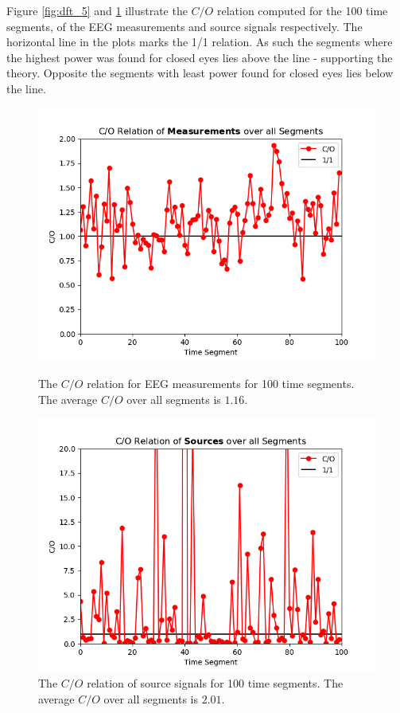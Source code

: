 Figure \ref{fig:dft_5} and \ref{fig:dft_6} illustrate the $C/O$ relation computed for the 100 time segments, of the EEG measurements and source signals respectively. 
The horizontal line in the plots marks the 1/1 relation.
As such the segments where the highest power was found for closed eyes lies above the line - supporting the theory. Opposite the segments with least power found for closed eyes lies below the line.      
\begin{figure}[H]
\begin{widepage}
    \begin{minipage}[t]{.49\textwidth}
\centering
\includegraphics[width=1\linewidth]{figures/ch_7/DFT_Y_Difference.png}
\caption{The $C/O$ relation for EEG measurements for 100 time segments. The average $C/O$ over all segments is $1.16$.}
\label{fig:dft_5}
\end{minipage} 
\hspace{.5cm}
\begin{minipage}[t]{.49\textwidth}
\centering
\includegraphics[width=1\linewidth]{figures/ch_7/DFT_X_Difference.png}
\caption{The $C/O$ relation of source signals for 100 time segments. The average $C/O$ over all segments is $2.01$.}
	\label{fig:dft_6}
    \end{minipage}
\end{widepage}
\end{figure}
